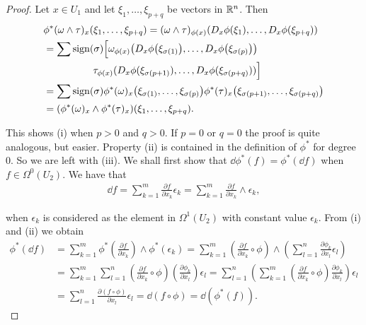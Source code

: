 \begin{proof}
  Let $x\in U_1$ and let $\xi_1, \ldots, \xi_{p+q}$ be vectors in ${\mathbb{R}}^n$. Then
  \begin{align*}
      & \phi^{*}(\omega\wedge\tau)_{x}(\xi_{1},\ldots,\xi_{p+q})
      = (\omega\wedge\tau)_{\phi(x)}(D_{x}\phi(\xi_{1}),\ldots,D_{x}\phi(\xi_{p+q})) \\
      & = \sum\mathrm{sign}(\sigma)\Big[\omega_{\phi(x)}\big(D_{x}\phi\big(\xi_{\sigma(1)}\big),\ldots,D_{x}\phi\big(\xi_{\sigma(p)}\big)\big) \\
      &\hspace*{5em} \tau_{\phi(x)}(D_x\phi(\xi_{\sigma(p+1)}),\ldots,D_x\phi(\xi_{\sigma(p+q)}))\Big] \\
      & = \sum\mathrm{sign}(\sigma)\phi^{*}(\omega)_{x}\big(\xi_{\sigma(1)},\ldots,\xi_{\sigma(p)}\big)
          \phi^{*}(\tau)_{x}\big(\xi_{\sigma(p+1)},\ldots,\xi_{\sigma(p+q)}\big) \\
      & = (\phi^{*}(\omega)_{x}\wedge\phi^{*}(\tau)_{x})(\xi_{1},\ldots,\xi_{p+q}).
  \end{align*}

  This shows (i) when $p > 0$ and $q > 0$. If $p = 0$ or $q = 0$ the proof is quite
analogous, but easier. Property (ii) is contained in the definition of $\phi^*$ for degree
0. So we are left with (iii). We shall first show that $\dd\phi^*(f) = \phi^*(\!\dd f)$ when
$f\in \Omega^0(U_2)$. We have that
\begin{align*}
  \dd f = \sum_{k=1}^{m}\frac{\partial f}{\partial x_k}\epsilon_k
        = \sum_{k=1}^{m}\frac{\partial f}{\partial x_k}\wedge\epsilon_k,
\end{align*}

when $\epsilon_k$ is considered as the element in $\Omega^1(U_2)$ with constant value $\epsilon_k$. From
(i) and (ii) we obtain
\begin{align*}
    \phi^{*}(\!\dd f)
    & = \sum_{k=1}^m\phi^*\left(\frac{\partial f}{\partial x_k}\right)\wedge\phi^*(\epsilon_k)
        = \sum_{k=1}^m\left(\frac{\partial f}{\partial x_k}\circ\phi\right)\wedge\left(\sum_{l=1}^n\frac{\partial\phi_k}{\partial x_l}\epsilon_l\right) \\
    & = \sum_{k=1}^m\sum_{l=1}^n\left(\frac{\partial f}{\partial x_k}\circ\phi\right)\left(\frac{\partial\phi_k}{\partial x_l}\right)\epsilon_l
        = \sum_{l=1}^n\left(\sum_{k=1}^m\left(\frac{\partial f}{\partial x_k}\circ\phi\right)\frac{\partial\phi_k}{\partial x_l}\right)\epsilon_l \\
    & = \sum_{l=1}^n\frac{\partial(f\circ\phi)}{\partial x_l}\epsilon_l
        = \dd(f\circ\phi) = \dd(\phi^*(f)).
\end{align*}


\end{proof}
